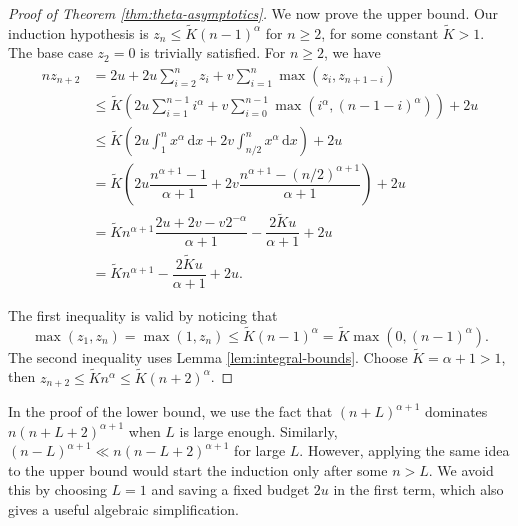 \begin{proof}[Proof of Theorem \ref{thm:theta-asymptotics}]

  We now prove the upper bound. Our induction hypothesis is $z_n \le \tilde{K} (n-1)^\alpha$ for $n\ge 2$, for some constant $\tilde{K} > 1$. The base case $z_2=0$ is trivially satisfied. For $n\ge 2$, we have
  \begin{align*}
    nz_{n+2}
     & = 2u + 2u\sum\limits_{i=2}^n z_i + v\sum\limits_{i=1}^n \max(z_i, z_{n+1-i})                                              \\
     & \le \tilde{K}\left(2u\sum\limits_{i=1}^{n-1} i^\alpha + v\sum\limits_{i=0}^{n-1} \max(i^\alpha, (n-1-i)^\alpha)\right)+2u \\
     & \le \tilde{K}\left(2u\int_1^{n} x^\alpha \, \mathrm{d}x + 2v\int_{n/2}^{n} x^\alpha \, \mathrm{d}x\right) + 2u            \\
     & = \tilde{K}\left(2u\dfrac{n^{\alpha+1} - 1}{\alpha+1} + 2v\dfrac{n^{\alpha+1} - (n/2)^{\alpha+1}}{\alpha+1}\right)+2u     \\
     & = \tilde{K}n^{\alpha+1}\dfrac{2u+2v - v2^{-\alpha}}{\alpha+1}- \dfrac{2\tilde{K}u}{\alpha+1}+2u                           \\
     & = \tilde{K}n^{\alpha+1} - \dfrac{2\tilde{K}u}{\alpha+1} + 2u.
  \end{align*}


  The first inequality is valid by noticing that
  $$\max(z_1, z_n) = \max(1, z_n) \le \tilde{K}(n-1)^\alpha = \tilde{K}\max(0, (n-1)^\alpha).$$
  The second inequality uses Lemma \ref{lem:integral-bounds}. Choose $\tilde{K}=\alpha+1 > 1$, then $z_{n+2} \le \tilde{K}n^\alpha \le \tilde{K}(n+2)^\alpha$.
\end{proof}

\begin{remark}
  In the proof of the lower bound, we use the fact that $(n+L)^{\alpha+1}$ dominates $n(n+L+2)^{\alpha+1}$ when $L$ is large enough. Similarly, $(n-L)^{\alpha+1} \ll n(n-L+2)^{\alpha+1}$ for large $L$. However, applying the same idea to the upper bound would start the induction only after some $n > L$. We avoid this by choosing $L=1$ and saving a fixed budget $2u$ in the first term, which also gives a useful algebraic simplification.
\end{remark}

